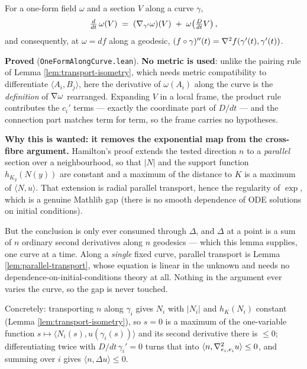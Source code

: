 \begin{lemma}
  \label{lem:oneform-along-curve}
  \leanok
  For a one-form field $\omega$ and a section $V$ along a curve $\gamma$,
  \[
    \tfrac{d}{dt}\,\omega(V) \;=\; (\nabla_{\gamma'}\omega)(V) \;+\; \omega\!\left(\tfrac{D}{dt}V\right),
  \]
  and consequently, at $\omega = df$ along a geodesic,
  $(f\circ\gamma)''(t) = \nabla^2 f(\gamma'(t),\gamma'(t))$.

  \textbf{Proved} (\texttt{OneFormAlongCurve.lean}). \textbf{No metric is used}: unlike the
  pairing rule of Lemma \ref{lem:transport-isometry}, which needs metric compatibility to
  differentiate $\langle A_i, B_j\rangle$, here the derivative of $\omega(A_i)$ along the
  curve is the \emph{definition} of $\nabla\omega$ rearranged. Expanding $V$ in a local frame,
  the product rule contributes the $c_i'$ terms --- exactly the coordinate part of $D/dt$ ---
  and the connection part matches term for term, so the frame carries no hypotheses.

  \textbf{Why this is wanted: it removes the exponential map from the cross-fibre argument.}
  Hamilton's proof extends the tested direction $n$ to a \emph{parallel} section over a
  neighbourhood, so that $|N|$ and the support function $h_{K_y}(N(y))$ are constant and a
  maximum of the distance to $K$ is a maximum of $\langle N, u\rangle$. That extension is
  radial parallel transport, hence the regularity of $\exp$, which is a genuine Mathlib gap
  (there is no smooth dependence of ODE solutions on initial conditions).

  But the conclusion is only ever consumed through $\Delta$, and $\Delta$ at a point is a sum
  of $n$ ordinary second derivatives along $n$ geodesics --- which this lemma supplies, one
  curve at a time. Along a \emph{single} fixed curve, parallel transport is Lemma
  \ref{lem:parallel-transport}, whose equation is linear in the unknown and needs no
  dependence-on-initial-conditions theory at all. Nothing in the argument ever varies the
  curve, so the gap is never touched.

  Concretely: transporting $n$ along $\gamma_i$ gives $N_i$ with $|N_i|$ and
  $h_K(N_i)$ constant (Lemma \ref{lem:transport-isometry}), so $s = 0$ is a maximum of the
  one-variable function $s \mapsto \langle N_i(s), u(\gamma_i(s))\rangle$ and its second
  derivative there is $\le 0$; differentiating twice with $D/dt\,\gamma_i' = 0$ turns that
  into $\langle n, \nabla^2_{e_i,e_i}u\rangle \le 0$, and summing over $i$ gives
  $\langle n, \Delta u\rangle \le 0$.


\end{lemma}
